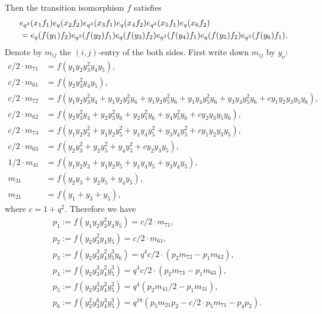 \documentclass[12pt,a4paper]{article}
\theoremstyle{plain} %
\theoremstyle{definition} %
\theoremstyle{definition} %
\numberwithin{theorem}{section}
\numberwithin{equation}{section}
\numberwithin{figure}{section}
\numberwithin{table}{section}
\begin{document}
Then the transition isomorphism $f$ satisfies
\begin{align}
 &
 e_{q^3}(x_1f_1)e_q(x_2f_2)       e_{q^3}(x_3f_1)e_q(x_4f_2)       e_{q^3}(x_5f_1)e_q(x_6f_2)
 \notag
 \\ & =
 e_q(f(y_1)f_2) e_{q^3}(f(y_2)f_1)e_q(f(y_3)f_2) e_{q^3}(f(y_4)f_1)e_q(f(y_5)f_2) e_{q^3}(f(y_6)f_1).
\end{align}
Denote by $m_{ij}$ the $(i,j)$-entry of the both sides.
First write down $m_{ij}$ by $y_\nu$:
\begin{align*}
c/2\cdot m_{71}&=f(y_1y_2y_3^2y_4y_5), \\
c/2\cdot m_{61}&=f(y_2y_3^2y_4y_5), \\
c/2\cdot m_{72}&=f(y_1y_2y_3^2y_4+y_1y_2y_3^2y_6+y_1y_2y_5^2y_6+y_1y_4y_5^2y_6+y_3y_4y_5^2y_6+cy_1y_2y_3y_5y_6), \\
c/2\cdot m_{62}&=f(y_2y_3^2y_4+y_2y_3^2y_6+y_2y_5^2y_6+y_4y_5^2y_6+cy_2y_3y_5y_6), \\
c/2\cdot m_{73}&=f(y_1y_2y_3^2+y_1y_2y_5^2+y_1y_4y_5^2+y_3y_4y_5^2+cy_1y_2y_3y_5), \\
c/2\cdot m_{63}&=f(y_2y_3^2+y_2y_5^2+y_4y_5^2+cy_2y_3y_5), \\
1/2\cdot m_{41}&=f(y_1y_2y_3+y_1y_2y_5+y_1y_4y_5+y_3y_4y_5), \\
         m_{31}&=f(y_2y_3+y_2y_5+y_4y_5), \\
         m_{21}&=f(y_1+y_3+y_5), 
\end{align*}
where $c=1+q^2$.
Therefore we have
\begin{align*}
 &
 p_1 := f(y_1y_2y_3^2y_4y_5) = c/2\cdot m_{71},
 \\ &
 p_2 := f(y_2y_3^2y_4y_5) = c/2\cdot m_{61},
 \\ &
 p_3 := f(y_2y_3^3y_4^2y_5^3y_6) = q^4c/2\cdot(p_2m_{72} - p_1m_{62}),
 \\ &
 p_4 := f(y_2y_3^3y_4^2y_5^3) = q^4c/2\cdot(p_2m_{73} - p_1m_{63}),
 \\ &
 p_5 := f(y_2y_3^3y_4^2y_5^2) = q^4(p_2m_{41}/2 - p_1m_{31}),
 \\ &
 p_6 := f(y_2^2y_3^6y_4^3y_5^3) = q^{18}(p_5m_{21}p_2 - c/2\cdot p_5m_{71} - p_4p_2).
\end{align*}
\end{document}
